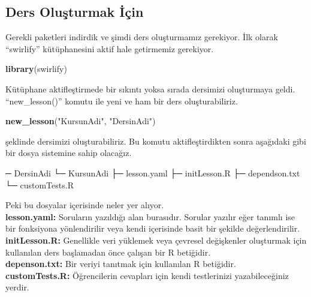 \documentclass[]{book}
\newenvironment{Shaded}{\begin{snugshade}}{\end{snugshade}}
\newcommand{\KeywordTok}[1]{\textcolor[rgb]{0.13,0.29,0.53}{\textbf{#1}}}
\newcommand{\StringTok}[1]{\textcolor[rgb]{0.31,0.60,0.02}{#1}}
\newcommand{\NormalTok}[1]{#1}
\begin{document}
\subsection{Ders Oluşturmak İçin}\label{ders-olusturmak-icin}

Gerekli paketleri indirdik ve şimdi ders oluşturmamız gerekiyor. İlk
olarak ``swirlify'' kütüphanesini aktif hale getirmemiz gerekiyor.

\begin{Shaded}
\begin{Highlighting}[]
\KeywordTok{library}\NormalTok{(swirlify)}
\end{Highlighting}
\end{Shaded}

Kütüphane aktifleştirmede bir sıkıntı yoksa sırada dersimizi oluşturmaya
geldi. ``new\_lesson()'' komutu ile yeni ve ham bir ders
oluşturabiliriz.

\begin{Shaded}
\begin{Highlighting}[]
\KeywordTok{new_lesson}\NormalTok{(}\StringTok{"KursunAdi"}\NormalTok{, }\StringTok{"DersinAdi"}\NormalTok{)}
\end{Highlighting}
\end{Shaded}

şeklinde dersimizi oluşturabiliriz. Bu komutu aktifleştirdikten sonra
aşağıdaki gibi bir dosya sistemine sahip olacağız.

\begin{Shaded}
\begin{Highlighting}[]
\NormalTok{─ DersinAdi}
\NormalTok{  └─ KursunAdi}
\NormalTok{     ├─ lesson.yaml}
\NormalTok{     ├─ initLesson.R}
\NormalTok{     ├─ dependson.txt}
\NormalTok{     └─ customTests.R}
\end{Highlighting}
\end{Shaded}

Peki bu dosyalar içerisinde neler yer alıyor.\\
\textbf{lesson.yaml:} Soruların yazıldığı alan burasıdır. Sorular
yazılır eğer tanımlı ise bir fonksiyona yönlendirilir veya kendi
içerisinde basit bir şekilde değerlendirilir.\\
\textbf{initLesson.R:} Genellikle veri yüklemek veya çevresel
değişkenler oluşturmak için kullanılan ders başlamadan önce çalışan bir
R betiğidir.\\
\textbf{depenson.txt:} Bir veriyi tanıtmak için kullanılan R
betiğidir.\\
\textbf{customTests.R:} Öğrencilerin cevapları için kendi testlerinizi
yazabileceğiniz yerdir.
\end{document}
